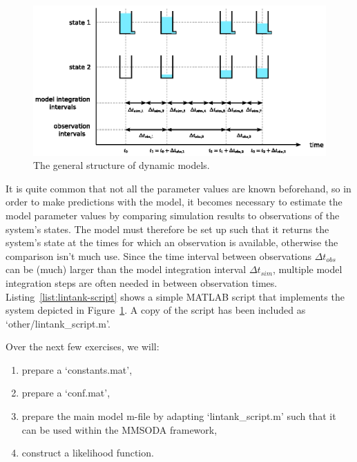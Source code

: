 \begin{figure}[htb]
  \centering
    \includegraphics[width=\linewidth,keepaspectratio]{./../eps/states-and-flows.eps}
  \caption{The general structure of dynamic models.}
  \label{fig:states-and-flows}
\end{figure}

It is quite common that not all the parameter values are known beforehand, so in order to make predictions with the model, it becomes necessary to estimate the model parameter values by comparing simulation results to observations of the system's states. The model must therefore be set up such that it returns the system's state at the times for which an observation is available, otherwise the comparison isn't much use. Since the time interval between observations $\Delta{}t_{obs}$ can be (much) larger than the model integration interval $\Delta{}t_{sim}$, multiple model integration steps are often needed in between observation times. Listing~\ref{list:lintank-script} shows a simple MATLAB script that implements the system depicted in Figure~\ref{fig:states-and-flows}.  A copy of the script has been included as `other/lintank\_script.m'.


Over the next few exercises, we will:
\begin{enumerate}
\item{prepare a `constants.mat',}
\item{prepare a `conf.mat',}
\item{prepare the main model m-file by adapting `lintank\_script.m' such that it can be used within the MMSODA framework,}
\item{construct a likelihood function.}
\end{enumerate}


